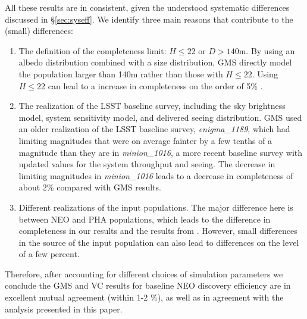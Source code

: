 All these results are in consistent, given the understood systematic differences discussed in \S\ref{sec:syseff}. We identify three main reasons that contribute to the (small) differences:
\begin{enumerate}
\item The definition of the completeness limit: $H\le22$ or $D>140$m. By using an albedo distribution combined 
with a size distribution, GMS directly model the population larger than 140m rather than those with $H\le22$. 
Using $H\le22$ can lead to a increase in completeness on the order of 5\% \citep{2016AJ....152...79W, GMS2016}.
\item The realization of the LSST baseline survey, including the sky brightness model, system sensitivity model, and
delivered seeing distribution.  GMS used an older realization of the LSST baseline survey, {\it enigma\_1189}, which
had limiting magnitudes that were on average fainter by a few tenths of a magnitude than they are in 
{\it minion\_1016}, a more recent baseline survey with updated values for the system throughput and seeing. 
The decrease in limiting magnitudes in {\it minion\_1016} leads to a decrease in completeness of about 2\% compared
with GMS results.
\item Different realizations of the input populations. The major difference here is between NEO and PHA populations,
which leads to the difference in completeness in our results and the results from \citet{VeresChesley2017neo}.
However, small differences in the source of the input population can also lead to differences on the level of a few percent\citep{VeresChesley2017neo}. 
\end{enumerate}

Therefore, after accounting for different choices of simulation parameters 
we conclude the GMS and VC results for baseline NEO discovery efficiency are in excellent mutual agreement (within 1-2 \%), as well as in agreement with the analysis presented in this paper.
